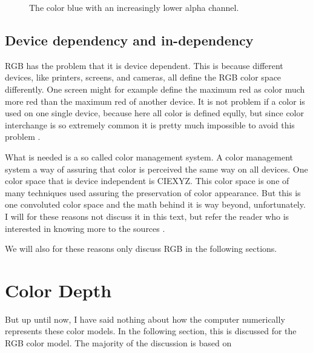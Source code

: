 \begin{figure}
  \centering
  \caption{The color blue with an increasingly lower alpha channel.}
  \label{fig:alpha}
\end{figure}

\subsection{Device dependency and in-dependency}

RGB has the problem that it is device dependent. This is because
different devices, like printers, screens, and cameras, all define the
RGB color space differently. One screen might for example define the
maximum red as color much more red than the maximum red of another
device. It is not problem if a color is used on one single device,
because here all color is defined eqully, but since color interchange
is so extremely common it is pretty much impossible to avoid this
problem
\cite{Pascale2003_ReviewRGBColourSpaces,boutel:_png_portab_networ_graph_specif_version12}.

What is needed is a so called color management system. A color
management system a way of assuring that color is perceived the same
way on all devices. One color space that is device independent is
CIEXYZ. This color space is one of many techniques used assuring the
preservation of color appearance. But this is one convoluted color
space and the math behind it is way beyond, unfortunately. I will for
these reasons not discuss it in this text, but refer the reader who is
interested in knowing more to the sources
\cite{schanda97:_colorimetry,Pascale2003_ReviewRGBColourSpaces,boutel:_png_portab_networ_graph_specif_version12,kerr:_cie_xyz_color_spaces,Fairman_Brill_Hemmendinger_1997}.

We will also for these reasons only discuss RGB in the following
sections.


\newcommand{\rgbtrip}[3]{\mbox{(#1,#2,#3)}}

\section{Color Depth}
\label{sec:color-depth}

But up until now, I have said nothing about how the computer
numerically represents these color models. In the following section,
this is discussed for the RGB color model. The majority of the
discussion is based on \cite{murray1996encyclopedia,neider93:_openg_progr_guide,niederst1999webdesign}

